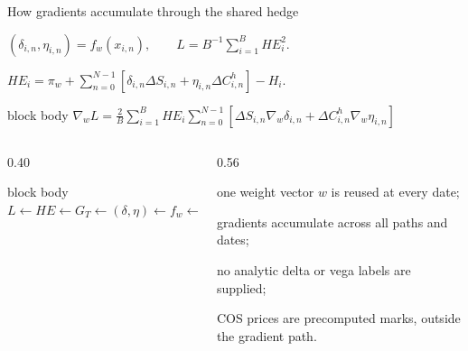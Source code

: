 \begin{frame}[t]{How gradients accumulate through the shared hedge}
  \centering
  {\fontsize{8.0}{9.1}\selectfont
    \((\delta_{i,n},\eta_{i,n})=f_w(x_{i,n}),\qquad
    L=B^{-1}\sum_{i=1}^B HE_i^2.\)\par}
  \vspace{0.05cm}
  {\fontsize{7.5}{8.6}\selectfont
    \(\displaystyle HE_i=\pi_w+\sum_{n=0}^{N-1}
    [\delta_{i,n}\Delta S_{i,n}+\eta_{i,n}\Delta C^h_{i,n}]-H_i.\)\par}
  \vspace{0.07cm}
  \begin{beamercolorbox}[rounded=true,sep=0.10cm]{block body}
    \centering
    {\fontsize{8.0}{9.3}\selectfont\(
      \boxed{\displaystyle \nabla_wL=\frac{2}{B}\sum_{i=1}^{B}HE_i
      \sum_{n=0}^{N-1}\left[
      \Delta S_{i,n}\nabla_w\delta_{i,n}
      +\Delta C^h_{i,n}\nabla_w\eta_{i,n}\right]}
    \)}
  \end{beamercolorbox}
  \vspace{0.05cm}
  \begin{columns}[T,onlytextwidth]
    \begin{column}{0.40\textwidth}
      \begin{beamercolorbox}[rounded=true,sep=0.10cm]{block body}
        \centering\scriptsize
        \(L\leftarrow HE\leftarrow G_T\leftarrow(\delta,\eta)\leftarrow f_w\leftarrow w\)
      \end{beamercolorbox}
    \end{column}
    \begin{column}{0.56\textwidth}
      {\fontsize{7.5}{8.6}\selectfont\begin{tightitemize}
        \item one weight vector \(w\) is reused at every date;
        \item gradients accumulate across all paths and dates;
        \item no analytic delta or vega labels are supplied;
        \item COS prices are precomputed marks, outside the gradient path.
      \end{tightitemize}}
    \end{column}
  \end{columns}
\end{frame}


